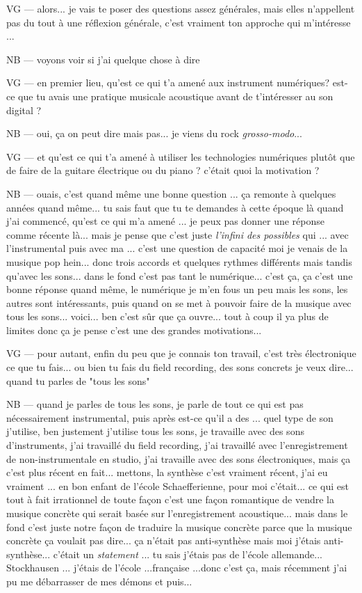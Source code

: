 VG — alors... je vais te poser des questions assez générales, mais elles n'appellent pas du tout à une réflexion générale, c'est vraiment ton approche qui m'intéresse ... 

NB — voyons voir si j'ai quelque chose à dire 

VG — en premier lieu, qu'est ce qui t'a amené aux instrument numériques? est-ce que tu avais une pratique musicale acoustique avant de t'intéresser au son digital ?

NB — oui, ça on peut dire mais pas... je viens du rock \textit{grosso-modo}... 

VG — et qu'est ce qui t'a amené à utiliser les technologies numériques plutôt que de faire de la guitare électrique ou du piano ? c'était quoi la motivation ?

NB — ouais, c'est quand même une bonne question ... ça remonte à quelques années quand même... tu sais faut que tu te demandes à cette époque là quand j'ai commencé, qu'est ce qui m'a amené ... je peux pas donner une réponse comme récente là... mais je pense que c'est juste \textit{l'infini des possibles} qui ... avec l'instrumental puis avec ma ... c'est une question de capacité moi je venais de la musique pop hein... donc trois accords et quelques rythmes différents mais tandis qu'avec les sons... dans le fond c'est pas tant le numérique... c'est ça, ça c'est une bonne réponse quand même, le numérique je m'en fous un peu mais les sons, les autres sont intéressants, puis quand on se met à pouvoir faire de la musique avec tous les sons... voici... ben c'est sûr que ça ouvre... tout à coup il ya plus de limites donc ça je pense c'est une des grandes motivations... 

VG — pour autant, enfin du peu que je connais ton travail, c'est très électronique ce que tu fais... ou bien tu fais du field recording, des sons concrets je veux dire... quand tu parles de "tous les sons"

NB — quand je parles de tous les sons, je parle de tout ce qui est pas nécessairement instrumental, puis après est-ce qu'il a des ... quel type de son j'utilise, ben justement j'utilise tous les sons, je travaille avec des sons d'instruments, j'ai travaillé du field recording, j'ai travaillé avec l'enregistrement de non-instrumentale en studio, j'ai travaille avec des sons électroniques, mais ça c'est plus récent en fait... mettons, la synthèse c'est vraiment récent, j'ai eu vraiment ... en bon enfant de l'école Schaefferienne, pour moi c'était... ce qui est tout à fait irrationnel de toute façon c'est une façon romantique de vendre la musique concrète qui serait basée sur l'enregistrement acoustique... mais dans le fond c'est juste notre façon de traduire la musique concrète parce que la musique concrète ça voulait pas dire... ça n'était pas anti-synthèse mais moi j'étais anti-synthèse... c'était un \textit{statement} ... tu sais j'étais pas de l'école allemande... Stockhausen ... j'étais de l'école ...française ...donc c'est ça, mais récemment j'ai pu me débarrasser de mes démons et puis...

